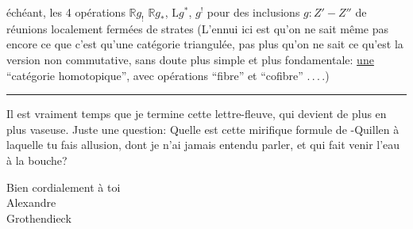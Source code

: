  échéant, les 4 opérations $\mathbb{R}g_!$ $\mathbb{R}g_*$, $\mathrm{L}g^*$, $g^!$ pour des inclusions $g:Z'-Z''$ de réunions localement fermées de strates (L'ennui ici est qu'on ne sait même pas encore ce que c'est qu'une catégorie triangulée, pas plus qu'on ne sait ce qu'est la version non commutative, sans doute plus simple et plus fondamentale: \uline{une} ``catégorie homotopique'', avec opérations ``fibre'' et ``cofibre'' .\,.\,.\,.)

\begin{center}\rule{0.41\linewidth}{0.4pt}\end{center}

Il est vraiment temps que je termine cette lettre-fleuve, qui devient de plus en plus vaseuse. Juste une question: Quelle est cette mirifique formule de -Quillen à laquelle tu fais allusion, dont je n'ai jamais entendu parler, et qui fait venir l'eau à la bouche?

Bien cordialement à toi\\
\hspace*{0.42\linewidth}Alexandre\\
\hspace*{0.52\linewidth}Grothendieck\\
